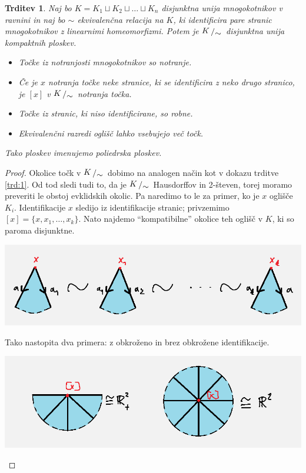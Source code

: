 \documentclass[10pt, a4paper]{article}
\newtheorem{trditev}[izr]{Trditev}
\newenvironment{noticeC}{%
  \tcolorbox[%
  notitle,
  empty,
  enhanced,  %
  breakable,
  coltext=black, 
  fontupper=\rmfamily,
  noparskip,
  sharp corners,
  boxrule=-1pt,  %
  frame hidden,
  left=7pt,  %
  right=7pt,
  top=5pt,
  bottom=5pt,
  before skip=2.5ex plus 2pt,
  after skip=2.5ex plus 2pt,
  overlay unbroken and last={%
  },
  ]}
{\endtcolorbox}
\newenvironment{dokaz}%
  {\begin{noticeC}\begin{proof}}%
  {\end{proof}\end{noticeC}}
\newcommand{\quot}[2]{{\raisebox{0.1em}{$#1$}\left/\raisebox{-0.2em}{$#2$}\right.}}
\begin{document}
\begin{trditev}
  Naj bo $K = K_1 \sqcup K_2 \sqcup \dots \sqcup K_n$ disjunktna unija mnogokotnikov v ravnini
  in naj bo $\sim$ ekvivalenčna relacija na $K$, ki identificira pare stranic 
  mnogokotnikov z linearnimi homeomorfizmi.
  Potem je $\quot{K}{\sim}$ disjunktna unija kompaktnih ploskev.
  \begin{itemize}
    \item Točke iz notranjosti mnogokotnikov so notranje.
    \item Če je $x$ notranja točke neke stranice, ki se identificira z neko drugo stranico,
    je $[x]$ v $\quot{K}{\sim}$ notranja točka.
    \item Točke iz stranic, ki niso identificirane, so robne.
    \item Ekvivalenčni razredi oglišč lahko vsebujejo več točk.
  \end{itemize}
  Tako ploskev imenujemo poliedrska ploskev.
\end{trditev}

\begin{dokaz}
  Okolice točk v $\quot{K}{\sim}$ dobimo na analogen način kot 
  v dokazu trditve \ref{trd:1}. Od tod sledi tudi to,
  da je $\quot{K}{\sim}$ Hausdorffov in 2-števen, torej moramo 
  preveriti le obstoj evklidskih okolic.
  Pa naredimo to le za primer, ko je $x$ oglišče $K_i$.
  Identifikacije $x$ sledijo iz identifikacije stranic; privzemimo 
  $[x] = \{x, x_1, \dots, x_k\}$. Nato najdemo "`kompatibilne"'
  okolice teh oglišč v $K$, ki so paroma disjunktne.
  \begin{center}
    \includegraphics[scale=0.7]{dokaz6.png}
  \end{center}
  Tako nastopita dva primera: z obkroženo in brez obkrožene identifikacije.
  \begin{center}
    \includegraphics[scale=0.6]{dokaz7.png}
  \end{center}  
\end{dokaz}
\end{document}
